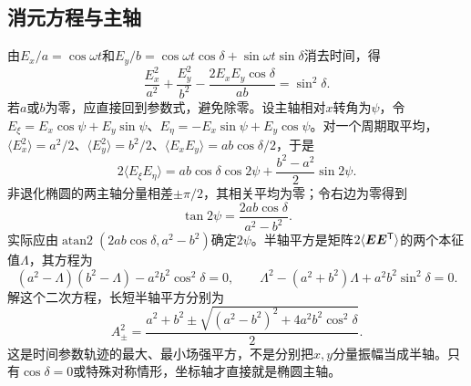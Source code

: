\subsection{消元方程与主轴}\label{th:o4ellipse}
由$E_x/a=\cos\omega t$和$E_y/b=\cos\omega t\cos\delta+\sin\omega t\sin\delta$消去时间，得
\begin{equation}\label{eq:o4ellipse}
 \frac{E_x^2}{a^2}+\frac{E_y^2}{b^2}
 -\frac{2E_xE_y\cos\delta}{ab}=\sin^2\delta.
\end{equation}
若$a$或$b$为零，应直接回到参数式，避免除零。设主轴相对$x$转角为$\psi$，令$E_\xi=E_x\cos\psi+E_y\sin\psi$、$E_\eta=-E_x\sin\psi+E_y\cos\psi$。对一个周期取平均，$\langle E_x^2\rangle=a^2/2$、$\langle E_y^2\rangle=b^2/2$、$\langle E_xE_y\rangle=ab\cos\delta/2$，于是
\[
 2\langle E_\xi E_\eta\rangle
 =ab\cos\delta\cos2\psi+\frac{b^2-a^2}{2}\sin2\psi.
\]
非退化椭圆的两主轴分量相差$\pm\pi/2$，其相关平均为零；令右边为零得到
\[
 \tan2\psi=\frac{2ab\cos\delta}{a^2-b^2}.
\]
实际应由$\operatorname{atan2}(2ab\cos\delta,a^2-b^2)$确定$2\psi$。半轴平方是矩阵$2\langle\bm{E}\bm{E}^{\mathsf T}\rangle$的两个本征值$\Lambda$，其方程为
\[
 (a^2-\Lambda)(b^2-\Lambda)-a^2b^2\cos^2\delta=0,
 \qquad \Lambda^2-(a^2+b^2)\Lambda+a^2b^2\sin^2\delta=0.
\]
解这个二次方程，长短半轴平方分别为
\[
 A_\pm^2=\frac{a^2+b^2\pm\sqrt{(a^2-b^2)^2+4a^2b^2\cos^2\delta}}2.
\]
这是时间参数轨迹的最大、最小场强平方，不是分别把$x,y$分量振幅当成半轴。只有$\cos\delta=0$或特殊对称情形，坐标轴才直接就是椭圆主轴。

